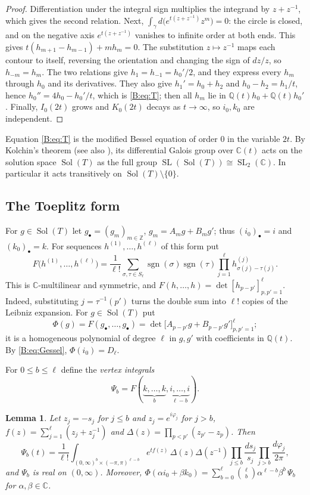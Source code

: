 \documentclass[11pt,a4paper]{article}
\newtheorem{lemma}[theorem]{Lemma}
\theoremstyle{definition}
\theoremstyle{remark}
\newcommand{\C}{\mathbb C}
\newcommand{\Q}{\mathbb Q}
\newcommand{\Z}{\mathbb Z}
\DeclareMathOperator{\Sol}{Sol}
\DeclareMathOperator{\sgn}{sgn}
\DeclareMathOperator{\SL}{SL}
\numberwithin{equation}{section}
\begin{document}
\begin{proof}
Differentiation under the integral sign multiplies the integrand by $z+z^{-1}$, which gives the second relation. Next, $\int_\gamma d\bigl(e^{t(z+z^{-1})}z^m\bigr)=0$: the circle is closed, and on the negative axis $e^{t(z+z^{-1})}$ vanishes to infinite order at both ends. This gives $t(h_{m+1}-h_{m-1})+mh_m=0$. The substitution $z\mapsto z^{-1}$ maps each contour to itself, reversing the orientation and changing the sign of $dz/z$, so $h_{-m}=h_m$. The two relations give $h_1=h_{-1}=h_0'/2$, and they express every $h_m$ through $h_0$ and its derivatives. They also give $h_1'=h_0+h_2$ and $h_0-h_2=h_1/t$, hence $h_0''=4h_0-h_0'/t$, which is \eqref{B:eq:T}; then all $h_m$ lie in $\Q(t)h_0+\Q(t)h_0'$. Finally, $I_0(2t)$ grows and $K_0(2t)$ decays as $t\to\infty$, so $i_0,k_0$ are independent.
\end{proof}

Equation \eqref{B:eq:T} is the modified Bessel equation of order $0$ in the variable $2t$. By Kolchin's theorem \cite{Kol68} (see also \cite{vdPS03}), its differential Galois group over $\C(t)$ acts on the solution space $\Sol(T)$ as the full group $\SL(\Sol(T))\cong\SL_2(\C)$. In particular it acts transitively on $\Sol(T)\setminus\{0\}$.

\subsection{The Toeplitz form}
For $g\in\Sol(T)$ let $g_\bullet=(g_m)_{m\in\Z}$, $g_m=A_mg+B_mg'$; thus $(i_0)_\bullet=i$ and $(k_0)_\bullet=k$. For sequences $h^{(1)},\dots,h^{(\ell)}$ of this form put
\[
F\bigl(h^{(1)},\dots,h^{(\ell)}\bigr)=\frac1{\ell!}\sum_{\sigma,\tau\in S_\ell}\sgn(\sigma)\sgn(\tau)\prod_{j=1}^{\ell}h^{(j)}_{\sigma(j)-\tau(j)} .
\]
This is $\C$-multilinear and symmetric, and $F(h,\dots,h)=\det[h_{p-p'}]_{p,p'=1}^{\ell}$. Indeed, substituting $j=\tau^{-1}(p')$ turns the double sum into $\ell!$ copies of the Leibniz expansion. For $g\in\Sol(T)$ put
\[
\Phi(g)=F(g_\bullet,\dots,g_\bullet)=\det\bigl[A_{p-p'}g+B_{p-p'}g'\bigr]_{p,p'=1}^{\ell};
\]
it is a homogeneous polynomial of degree $\ell$ in $g,g'$ with coefficients in $\Q(t)$. By \eqref{B:eq:Gessel}, $\Phi(i_0)=D_\ell$.

For $0\le b\le\ell$ define the \emph{vertex integrals}
\[
\Psi_b=F(\underbrace{k,\dots,k}_{b},\underbrace{i,\dots,i}_{\ell-b}).
\]

\begin{lemma}\label{B:lem:Psi-int}
Let $z_j=-s_j$ for $j\le b$ and $z_j=e^{i\varphi_j}$ for $j>b$, $f(z)=\sum_{j=1}^{\ell}(z_j+z_j^{-1})$ and $\Delta(z)=\prod_{p<p'}(z_{p'}-z_p)$. Then
\[
\Psi_b(t)=\frac1{\ell!}\int_{(0,\infty)^b\times(-\pi,\pi)^{\ell-b}}e^{tf(z)}\,\Delta(z)\Delta(z^{-1})\prod_{j\le b}\frac{ds_j}{s_j}\prod_{j>b}\frac{d\varphi_j}{2\pi},
\]
and $\Psi_b$ is real on $(0,\infty)$. Moreover, $\Phi(\alpha i_0+\beta k_0)=\sum_{b=0}^{\ell}\binom{\ell}{b}\alpha^{\ell-b}\beta^b\,\Psi_b$ for $\alpha,\beta\in\C$.
\end{lemma}
\end{document}
